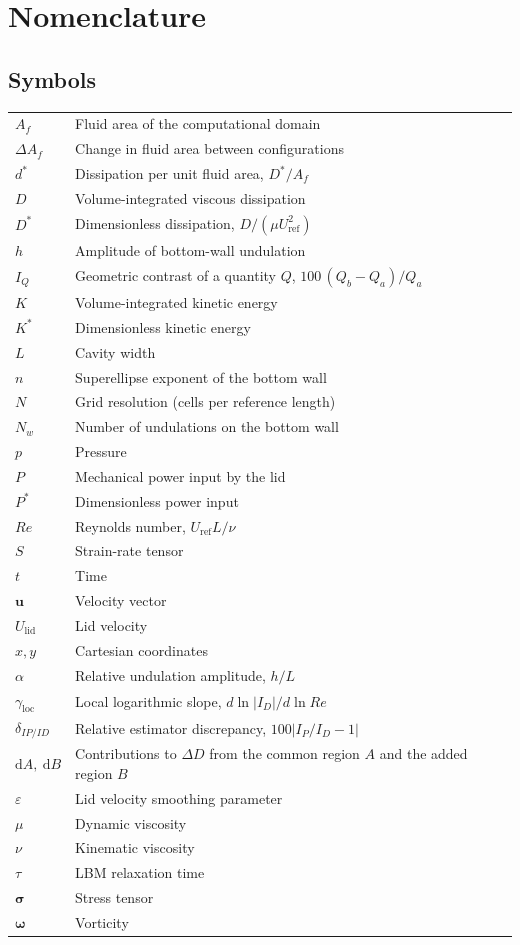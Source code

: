 ﻿\section*{Nomenclature}

\subsection*{Symbols}
\begin{tabular}{@{}ll@{}}
$A_f$ & Fluid area of the computational domain \\
$\Delta A_f$ & Change in fluid area between configurations \\
$d^*$ & Dissipation per unit fluid area, $D^*/A_f$ \\
$D$   & Volume-integrated viscous dissipation \\
$D^*$ & Dimensionless dissipation, $D/(\mu U_{\mathrm{ref}}^2)$ \\
$h$   & Amplitude of bottom-wall undulation \\
$I_Q$ & Geometric contrast of a quantity $Q$, $100\,(Q_b-Q_a)/Q_a$ \\
$K$   & Volume-integrated kinetic energy \\
$K^*$ & Dimensionless kinetic energy \\
$L$   & Cavity width \\
$n$   & Superellipse exponent of the bottom wall \\
$N$   & Grid resolution (cells per reference length) \\
$N_w$ & Number of undulations on the bottom wall \\
$p$   & Pressure \\
$P$   & Mechanical power input by the lid \\
$P^*$ & Dimensionless power input \\
$Re$  & Reynolds number, $U_{\mathrm{ref}}L/\nu$ \\
$S$   & Strain-rate tensor \\
$t$   & Time \\
$\mathbf{u}$ & Velocity vector \\
$U_{\mathrm{lid}}$ & Lid velocity \\
$x,y$ & Cartesian coordinates \\
$\alpha$ & Relative undulation amplitude, $h/L$ \\
$\gamma_{\mathrm{loc}}$ & Local logarithmic slope, $d\ln|I_D|/d\ln Re$ \\
$\delta_{IP/ID}$ & Relative estimator discrepancy, $100|I_P/I_D-1|$ \\
$\mathrm{d}A,\ \mathrm{d}B$ & Contributions to $\Delta D$ from the common region $A$ and the added region $B$ \\
$\varepsilon$ & Lid velocity smoothing parameter \\
$\mu$  & Dynamic viscosity \\
$\nu$  & Kinematic viscosity \\
$\tau$ & LBM relaxation time \\
$\boldsymbol{\sigma}$ & Stress tensor \\
$\boldsymbol{\omega}$ & Vorticity
\end{tabular}

